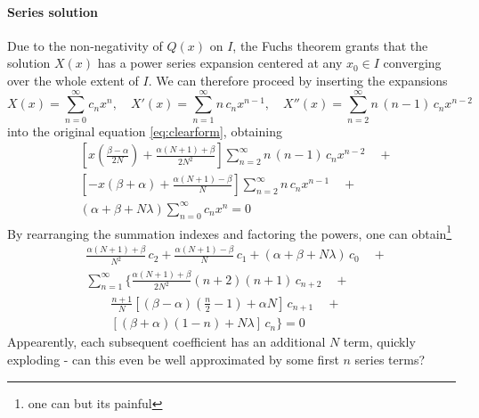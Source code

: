 \documentclass{article}
\newcommand{\red}[1]{{\color{red}#1}}
\begin{document}
	\paragraph{Series solution} Due to the non-negativity of $Q(x)$ on $I$, the
	Fuchs theorem grants that the solution $X(x)$ has a power series expansion
	centered at any $x_0 \in I$ converging over the whole extent of $I$.
	We can therefore proceed by inserting the expansions
	\begin{equation*}
		X(x) = \sum_{n=0}^{\infty} c_n x^n, \quad	
		X'(x) = \sum_{n=1}^{\infty} n \, c_n x^{n-1}, \quad	
		X''(x) = \sum_{n=2}^{\infty} n \, (n-1) \, c_n x^{n-2}
	\end{equation*}
	into the original equation \eqref{eq:clearform}, obtaining
	\begin{align*}
		&\left[x\left(\frac{\beta - \alpha}{2N}\right) + \frac{\alpha(N+1) +
		\beta}{2N^2}\right]\sum_{n=2}^{\infty} n \, (n-1) \, c_n x^{n-2} \quad +
		\\
		&\left[- x\left( \beta + \alpha \right) + \frac{\alpha(N+1) -
		\beta}{N}\right]\sum_{n=2}^{\infty} n \, c_n x^{n-1} \quad + 
		\\
		&(\alpha + \beta + N\lambda) \sum_{n=0}^{\infty} c_n x^n = 0
	\end{align*}
	By rearranging the summation indexes and factoring the powers, one can
	obtain\footnote{one can but its painful}
	\begin{align*}
		&\frac{\alpha(N+1) + \beta}{N^2} \, c_2 + \frac{\alpha(N+1) -\beta}{N} \,
		c_1 + (\alpha + \beta + N\lambda) \, c_0 \quad + 
		\\ 
		&\sum_{n=1}^{\infty} 
		\Big\{\frac{\alpha(N+1) + \beta}{2N^2}(n+2)(n+1) \, c_{n+2} \quad + \\
		&\qquad \frac{n+1}{N} \left[(\beta-\alpha)\left(\frac{n}{2}-1\right) +
		\alpha N \right] \, c_{n+1} \quad + \\
		&\qquad \left[(\beta + \alpha)(1-n) + N\lambda \right] \, c_n \Big\} = 0
	\end{align*}
	\red{Appearently, each subsequent coefficient has an additional $N$ term,
		quickly exploding - can this even be well approximated by some first $n$
	series terms?}
\end{document}
